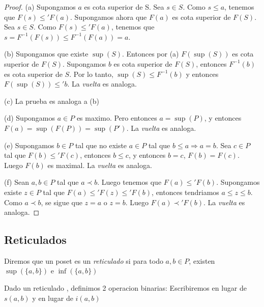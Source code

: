 \begin{proof}
  (a) Supongamos $a$ es cota superior de S. Sea $s \in S$. Como $s \leq a$,
  tenemos que $F(s) \leq' F(a)$. Supongamos ahora que $F(a)$ es cota superior de $F(S)$. Sea $s \in S$.
  Como $F(s) \leq' F(a)$, tenemos que $s = F^{-1}(F(s)) \leq F^{-1}(F(a)) = a$.
  
  (b) Supongamos que existe $\sup(S)$. Entonces por (a) $F(\sup(S))$ es cota superior de $F(S)$.
  Supongamos $b$ es cota superior de $F(S)$, entonces $F^{-1}(b)$ es cota superior de $S$. Por lo tanto,
  $\sup(S) \leq F^{-1}(b)$ y entonces $F(\sup(S)) \leq' b$. La \emph{vuelta} es analoga.
  
  (c) La prueba es analoga a (b)
  
  (d) Supongamos $a \in P$ es maximo. Pero entonces $a = \sup(P)$, y entonces $F(a) = \sup(F(P)) = \sup(P')$.
  La \emph{vuelta} es analoga.

  (e) Supongamos $b \in P$ tal que no existe $a \in P$ tal que $b \leq a \Rightarrow a = b$.  Sea $c \in P$ tal que
  $F(b) \leq' F(c)$, entonces $b \leq c$, y entonces $b = c$, $F(b) = F(c)$. Luego $F(b)$ es maximal.
  La \emph{vuelta} es analoga.

  (f) Sean $a, b \in P$ tal que $a \prec b$. Luego tenemos que $F(a) \leq' F(b)$. Supongamos existe $z \in P$ tal que
  $F(a) \leq' F(z) \leq' F(b)$, entonces tendriamos $a \leq z \leq b$. Como $a \prec b$, se sigue que $z = a$ o $z = b$. Luego $F(a) \prec' F(b)$.
  La \emph{vuelta} es analoga.
\end{proof}

\subsection{Reticulados}
\begin{definition}
  Diremos que un poset \poset es un \emph{reticulado} si para todo $a, b \in P$, existen $\sup(\{a, b\})$ e $\inf(\{a, b\})$
\end{definition}

\begin{definition}
  Dado un reticulado \poset, definimos 2 operacion binarias:
Escribiremos  en lugar de $s(a, b)$ y  en lugar de $i(a, b)$
\end{definition}

